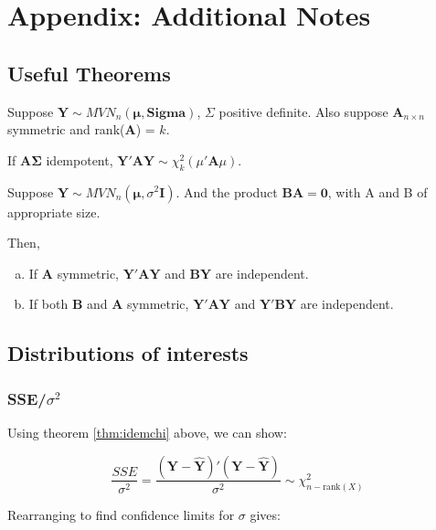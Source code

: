 \documentclass[11pt]{article}
\begin{document}
{
\section{Appendix: Additional Notes}
\label{sec-5}
\subsection{Useful Theorems}
\label{sec-5-1}


\begin{theorem}
\label{thm:idemchi}
Suppose $\mathbf{Y} \sim MVN_n(\mathbf{\mu}, \mathbf{Sigma})$, $\Sigma$ positive definite. 
Also suppose $\mathbf{A}_{n \times n}$ symmetric and rank($\mathbf{A}$) = $k$.

If $\mathbf{A\Sigma}$ idempotent, $\mathbf{Y'AY} \sim \chi^2_k (\mu'\mathbf{A}\mu)$.

\end{theorem}

\begin{theorem}
Suppose $\mathbf{Y} \sim MVN_n(\mathbf{\mu}, \sigma^2\mathbf{I})$. And the product $\mathbf{BA}=\mathbf{0}$, with A and B of appropriate size.

Then,

\begin{enumerate}[(a)]
\item If $\mathbf{A}$ symmetric, $\mathbf{Y'AY}$ and $\mathbf{BY}$ are independent.
\item If both $\mathbf{B}$ and $\mathbf{A}$ symmetric, $\mathbf{Y'AY}$ and $\mathbf{Y'BY}$ are independent.
\end{enumerate}

\end{theorem}
\subsection{Distributions of interests}
\label{sec-5-2}
\subsubsection{SSE/$\sigma$$^2$}
\label{sec-5-2-1}


Using theorem \ref{thm:idemchi} above, we can show:

$$\frac{SSE}{\sigma^2} = \frac{(\mathbf{Y} -
\hat{\mathbf{Y}})'(\mathbf{Y} - \hat{\mathbf{Y}})}{\sigma^2} \sim
\chi^2_{n-\text{rank}(X)}$$

Rearranging to find confidence limits for $\sigma$ gives:

}
\end{document}
